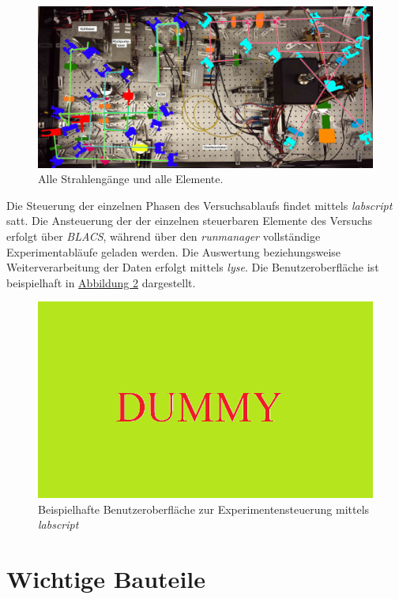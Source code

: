 \documentclass[
class=book,
accentcolor=1b,
custommargins=geometry,
fontsize=11pt,
thesis={type=Versuchsanleitung},
ruledheaders=all,
headline=false,
instbox=false,
marginpar=false,
title=small,
ignore-missing-data=true,
twoside=false,
logofile=apqdesign/tuda_logo.pdf,
pdfa=false %
]{apqpub}
\begin{document}
\begin{figure}[htb!]
	\centering
	\includegraphics[width=\textwidth]{graphics/AEGB.jpg}
	\caption{Alle Strahlengänge und alle Elemente.}
	\label{fig:AEGBv}
\end{figure}

Die Steuerung der einzelnen Phasen des Versuchsablaufs findet mittels \textit{labscript} satt. 
Die Ansteuerung der der einzelnen steuerbaren Elemente des Versuchs erfolgt über \textit{BLACS}, während über den \textit{runmanager} vollständige Experimentabläufe geladen werden. 
Die Auswertung beziehungsweise Weiterverarbeitung der Daten erfolgt mittels \textit{lyse}. 
Die Benutzeroberfläche ist beispielhaft in \hyperref[fig:ES]{Abbildung \ref{fig:ES}} dargestellt.
\begin{figure}[htb!]
	\centering
	\includegraphics[width=\textwidth]{graphics/dummy.png}
	\caption{Beispielhafte Benutzeroberfläche zur Experimentensteuerung mittels \textit{labscript}}
	\label{fig:ES}
\end{figure}

\chapter{Wichtige Bauteile}
\end{document}
